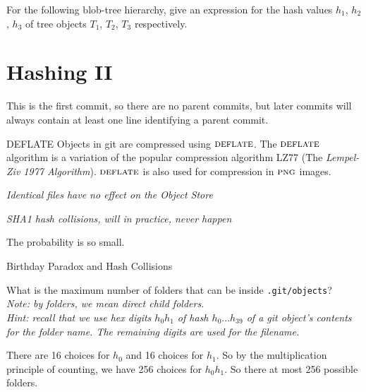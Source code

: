 \frmrule 

\begin{example}
For the following blob-tree hierarchy, give an expression for 
the hash values $h_1$, $h_2$, $h_3$ of tree objects $T_1$, $T_2$, 
$T_3$ respectively. 
\end{example}



\section{Hashing II}




\frmrule 

This is the first commit, so there are no parent commits, 
but later commits will always contain at least one line identifying a parent commit.

\frmrule 


\begin{sidenote}{DEFLATE}
Objects in git are 
compressed using $\textsc{deflate}$. The $\textsc{deflate}$ algorithm is a 
variation of the popular compression algorithm LZ77 
(The \textit{Lempel-Ziv 1977 Algorithm}).  $\textsc{deflate}$ is also used 
for compression in $\textsc{png}$ images.
\end{sidenote}




\frmrule 


\textit{Identical files have no effect on the Object Store}





\frmrule 

\textit{SHA1 hash collisions, will in practice, never happen }

The probability is so small. 

\begin{sidenote}{Birthday Paradox and Hash Collisions}

\end{sidenote}


\frmrule

\begin{example}
What is the maximum number of folders that can be inside 
\lstinline{.git/objects}?
\\
\textit{Note: by folders, we mean direct child folders.}\\
\textit{Hint: recall that we use hex digits $h_0h_1$ of 
hash $h_0...h_{39}$ of a git object's contents for the 
folder name. The remaining digits are used for the filename.}

There are 16 choices for $h_0$ and 16 choices 
for $h_1$. So by the multiplication principle 
of counting, we have 256 choices for $h_0h_1$. 
So there at most 256 possible folders. 
\end{example}

